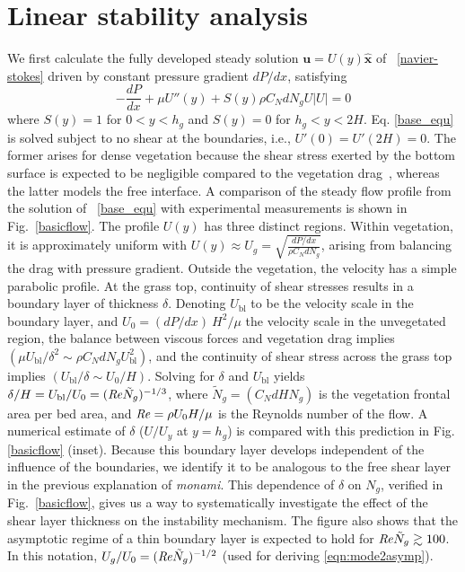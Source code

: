 \documentclass{jfm}
\newcommand{\bu}{\mathbf{u}}
\newcommand{\hg}{h_g}
\newcommand{\Ndg}{\tilde{N}_g}
\newcommand{\monami}{\textit{monami}}
\newcommand{\ubl}{U_\text{bl}}
\newcommand{\ReyNdg}{{\Rey\Ndg}}
\begin{document}
\section{Linear stability analysis}
We first calculate the fully developed steady solution $\bu = U(y)\boldsymbol{\hat{x}}$ of ~\eqref{navier-stokes} driven by constant pressure gradient $dP/dx$, satisfying
\begin{equation}
 -\frac{dP}{dx}+\mu U''(y) +S(y) \rho C_N d N_gU |U|=0
\label{base_equ}
\end{equation}
where $S(y)=1$ for $0<y<\hg$ and $S(y)=0$ for $\hg< y< 2H$. 
Eq. \eqref{base_equ} is solved subject to no shear at the boundaries, i.e., $U'(0) = U'(2H) = 0$.
The former arises for dense vegetation because the shear stress exerted by the bottom surface is expected to be negligible compared to the vegetation drag~\cite{Nepf00}, whereas the latter models the free interface. 
A comparison of the steady flow profile from the solution of ~\eqref{base_equ} with experimental measurements is shown in Fig.~\ref{basicflow}.
The profile $U(y)$ has three distinct regions.
Within vegetation, it is approximately uniform with $ U(y) \approx U_g = \sqrt{\frac{dP/dx}{\rho C_N dN_g}}$, arising from balancing the drag with pressure gradient. 
Outside the vegetation, the velocity has a simple parabolic profile. %
At the grass top, continuity of shear stresses results in a boundary layer of thickness $\delta$. 
Denoting $\ubl$ to be the velocity scale in the boundary layer, and $U_0 = {(dP/dx)~H^2}/{\mu}$ the velocity scale in the unvegetated region, the balance between viscous forces and vegetation drag implies $(\mu \ubl/\delta^2 \sim \rho C_N d N_g \ubl^2)$, and the continuity of shear stress across the grass top implies $(\ubl/\delta \sim U_0/H)$.
Solving for $\delta$ and $\ubl$ yields $\delta/H = \ubl/U_0=(\ReyNdg)^{-1/3}$, where $\Ndg = \left(C_N d H N_g\right)$ is the vegetation frontal area per bed area, and $\mbox{\textit{Re}}=\rho U_0 H/\mu$ is the Reynolds number of the flow. 
A numerical estimate of $\delta$ ($U/U_y$ at $y=\hg$) is compared with this prediction in Fig. \ref{basicflow} (inset).
Because this boundary layer develops independent of the influence of the boundaries, we identify it to be analogous to the free shear layer \cite{Ghisal02,Nepf04} in the previous explanation of \monami.
This dependence of $\delta$ on $N_g$, verified in Fig.~\ref{basicflow}, gives us a way to systematically investigate the effect of the shear layer thickness on the instability mechanism.
The figure also shows that the asymptotic regime of a thin boundary layer is expected to hold for $\ReyNdg \gtrsim 100$. In this notation, $U_g/U_0 = (\Rey \Ndg)^{-1/2}$ (used for deriving \eqref{eqn:mode2asymp}). 
\end{document}
